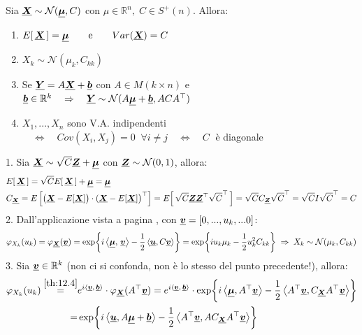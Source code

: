 \begin{proposizione}
\label{prop:13.5}
    Sia $\underline{{\boldsymbol{X}}}\sim \mathcal{N}(\underline{{\boldsymbol{\mu}}}, C)$ con $\mu\in\mathbb{R}^n, \;C\in S^+(n)$. Allora:
    \begin{enumerate}
        \item $E\!\left[\,\underline{{\boldsymbol{X}}}\,\right] = \underline{{\boldsymbol{\mu}}}\qquad \text{e}\qquad Var(\underline{{\boldsymbol{X}}}) = C$
        \item $X_k \sim \mathcal{N}(\mu_k, C_{kk})$
        \item Se $\underline{{\boldsymbol{Y}}} = A\underline{{\boldsymbol{X}}} + \underline{{\boldsymbol{b}}}$ con $A\in M(k\times n)$ e $\underline{{\boldsymbol{b}}}\in\mathbb{R}^k\quad \Rightarrow\quad \underline{{\boldsymbol{Y}}}\sim \mathcal{N}(A\underline{{\boldsymbol{\mu}}}+\underline{{\boldsymbol{b}}}, ACA^\top)$
        \item $X_1, ..., X_n$ sono V.A. indipendenti $\quad \iff \quad Cov(X_i, X_j) = 0 \;\;\forall i\neq j\quad \iff \quad C\;$ è diagonale
    \end{enumerate}
    \begin{dimostrazione}
        1. Sia $\underline{{\boldsymbol{X}}}\sim \sqrt{C} \underline{{\boldsymbol{Z}}} + \underline{{\boldsymbol{\mu}}}$ con $\underline{{\boldsymbol{Z}}}\sim \mathcal{N}(0, 1)$, allora:
        \begin{align*}
            & E\!\left[\,\underline{{\boldsymbol{X}}}\,\right] = \sqrt{C}E\!\left[\,\underline{{\boldsymbol{X}}}\,\right] + \underline{{\boldsymbol{\mu}}} = \underline{{\boldsymbol{\mu}}}\\
            & C_{\underline{{\boldsymbol{X}}}} = E\left[\bigl(\underline{{\boldsymbol{X}}}-E[\underline{{\boldsymbol{X}}}]\bigr)\cdot (\underline{{\boldsymbol{X}}}-E[\underline{{\boldsymbol{X}}}]\bigr)^\top\right] = E\!\left[\,\sqrt{C}\underline{{\boldsymbol{Z}}}\underline{{\boldsymbol{Z}}}^\top \sqrt{C}^\top\,\right] = \sqrt{C} C_{\underline{{\boldsymbol{Z}}}} \sqrt{C}^\top = \sqrt{C}I\sqrt{C}^\top = C 
        \end{align*}
        2. Dall'applicazione vista a pagina \pageref{pag:107}, con $\underline{{\boldsymbol{v}}} = [0, ..., u_k, ...0]$:
        \begin{align*}
            \varphi_{X_k}(u_k) = \varphi_{\underline{{\boldsymbol{X}}}}(\underline{{\boldsymbol{v}}}) = \exp\!\left\{i\left\langle \underline{{\boldsymbol{\mu}}},\, \underline{{\boldsymbol{v}}} \right\rangle-\frac{1}{2}\left\langle\underline{{\boldsymbol{u}}}, C\underline{{\boldsymbol{v}}}\right\rangle \right\} = \exp\!\left\{i u_k\mu_k -\frac{1}{2}u_k^2C_{kk} \right\} \; \Rightarrow \; X_k\sim\mathcal{N}(\mu_k, C_{kk})
        \end{align*}
        3. Sia $\underline{{\boldsymbol{v}}}\in \mathbb{R}^k$ (non ci si confonda, non è lo stesso del punto precedente!), allora:
        \begin{align*}
            \varphi_{X_k}(u_k) \overset{\ref{th:12.4}}{=} &e^{i\scalar{v}{b}}\cdot \varphi_{\ve{X}}(A^\top \ve{v}) = e^{i\scalar{v}{b}}\cdot \ex{i \left\langle\ve{\mu}, A^\top\ve{v}\right\rangle -\frac{1}{2} \left\langle A^\top\ve{v}, C_{\ve{X}}A^\top\ve{v}\right\rangle} \\
            = & \ex{i \left\langle\ve{u}, A\ve{\mu}+\ve{b}\right\rangle -\frac{1}{2} \left\langle A^\top \ve{v}, AC_{\ve{X}}A^\top\ve{v}\right\rangle}

\end{align*}
\end{dimostrazione}
\end{proposizione}
